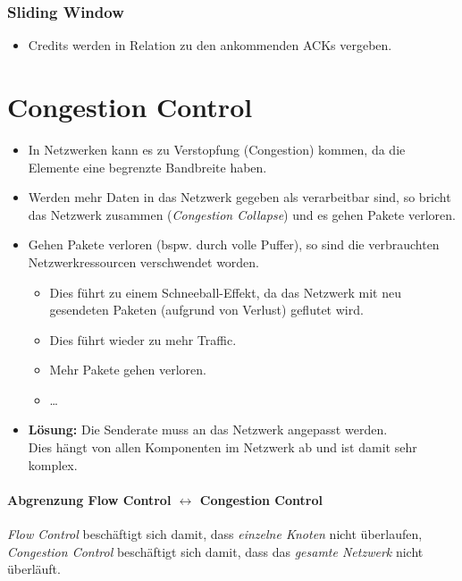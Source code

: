 			\subsubsection{Sliding Window}
				\begin{itemize}
					\item Credits werden in Relation zu den ankommenden ACKs vergeben.
				\end{itemize}

	\section{Congestion Control}
		\begin{itemize}
			\item In Netzwerken kann es zu Verstopfung (Congestion) kommen, da die Elemente eine begrenzte Bandbreite haben.
			\item Werden mehr Daten in das Netzwerk gegeben als verarbeitbar sind, so bricht das Netzwerk zusammen (\textit{Congestion Collapse}) und es gehen Pakete verloren.
			\item Gehen Pakete verloren (bspw. durch volle Puffer), so sind die verbrauchten Netzwerkressourcen verschwendet worden.
				\begin{itemize}
					\item Dies führt zu einem Schneeball-Effekt, da das Netzwerk mit neu gesendeten Paketen (aufgrund von Verlust) geflutet wird.
					\item Dies führt wieder zu mehr Traffic.
					\item Mehr Pakete gehen verloren.
					\item \dots
				\end{itemize}
			\item \textbf{Lösung:} Die Senderate muss an das Netzwerk angepasst werden. \\ Dies hängt von allen Komponenten im Netzwerk ab und ist damit sehr komplex.
		\end{itemize}

		\paragraph{Abgrenzung Flow Control \( \leftrightarrow \) Congestion Control}
			\textit{Flow Control} beschäftigt sich damit, dass \textit{einzelne Knoten} nicht überlaufen, \\
			\indent \textit{Congestion Control} beschäftigt sich damit, dass das \textit{gesamte Netzwerk} nicht überläuft.

